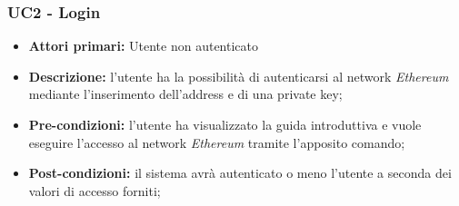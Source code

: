 \subsubsection{UC2 - Login}
\begin{itemize}
	\item \textbf{Attori primari:} Utente non autenticato
	\item \textbf{Descrizione:} l'utente ha la possibilità di autenticarsi al network \textit{Ethereum\glo} mediante l'inserimento dell'address e di una private key\glos; 
	\item \textbf{Pre-condizioni:} l'utente ha visualizzato la guida introduttiva e vuole eseguire l'accesso al network \textit{Ethereum} tramite l'apposito comando;
	\item \textbf{Post-condizioni:} il sistema avrà autenticato o meno l'utente a seconda dei valori di accesso forniti;
\end{itemize}